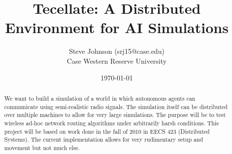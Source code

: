 \documentclass[12pt]{article}
\title{Tecellate: A Distributed Environment for AI Simulations}
\author{
        Steve Johnson (srj15@case.edu)\\
        Case Western Reserve University\\
}
\date{\today}
\begin{document}
\doublespacing
\maketitle


\begin{abstract}
    We want to build a simulation of a world in which autonomous agents can communicate using semi-realistic radio signals. The simulation itself can be distributed over multiple machines to allow for very large simulations. The purpose will be to test wireless ad-hoc network routing algorithms under arbitrarily harsh conditions.
    This project will be based on work done in the fall of 2010 in EECS 423 (Distributed Systems). The current implementation allows for very rudimentary setup and movement but not much else.
\end{abstract}













\end{document}
